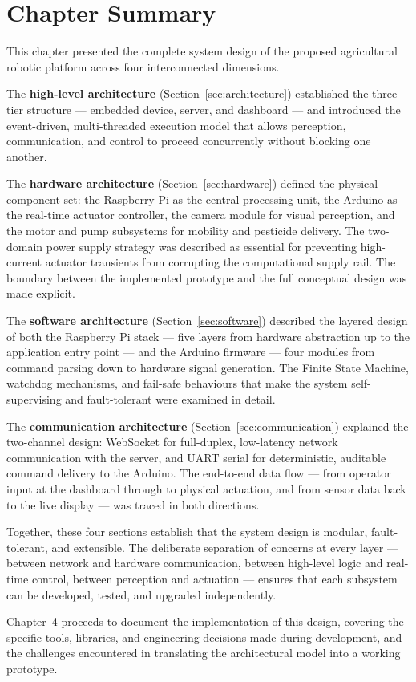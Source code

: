  
\section*{Chapter Summary}
 
This chapter presented the complete system design of the proposed
agricultural robotic platform across four interconnected dimensions.
 
The \textbf{high-level architecture} (Section~\ref{sec:architecture})
established the three-tier structure — embedded device, server, and
dashboard — and introduced the event-driven, multi-threaded execution
model that allows perception, communication, and control to proceed
concurrently without blocking one another.
 
The \textbf{hardware architecture} (Section~\ref{sec:hardware})
defined the physical component set: the Raspberry Pi as the central
processing unit, the Arduino as the real-time actuator controller,
the camera module for visual perception, and the motor and pump
subsystems for mobility and pesticide delivery. The two-domain power
supply strategy was described as essential for preventing
high-current actuator transients from corrupting the computational
supply rail. The boundary between the implemented prototype and the
full conceptual design was made explicit.
 
The \textbf{software architecture} (Section~\ref{sec:software})
described the layered design of both the Raspberry Pi stack — five
layers from hardware abstraction up to the application entry point —
and the Arduino firmware — four modules from command parsing down to
hardware signal generation. The Finite State Machine, watchdog
mechanisms, and fail-safe behaviours that make the system
self-supervising and fault-tolerant were examined in detail.
 
The \textbf{communication architecture} (Section~\ref{sec:communication})
explained the two-channel design: WebSocket for full-duplex,
low-latency network communication with the server, and UART serial
for deterministic, auditable command delivery to the Arduino. The
end-to-end data flow — from operator input at the dashboard through
to physical actuation, and from sensor data back to the live display
— was traced in both directions.
 
Together, these four sections establish that the system design is
modular, fault-tolerant, and extensible. The deliberate separation of
concerns at every layer — between network and hardware communication,
between high-level logic and real-time control, between perception and
actuation — ensures that each subsystem can be developed, tested, and
upgraded independently.
 
Chapter~4 proceeds to document the implementation of this design,
covering the specific tools, libraries, and engineering decisions made
during development, and the challenges encountered in translating the
architectural model into a working prototype.